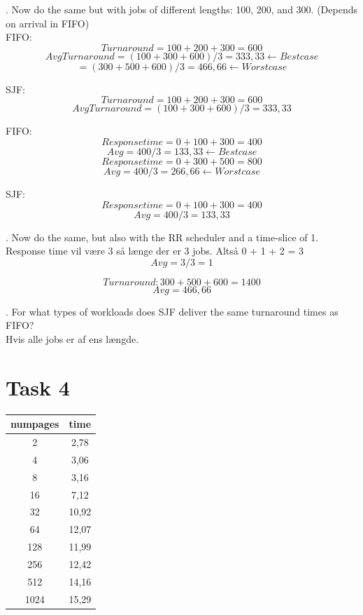 \documentclass[12pt]{article}
\begin{document}
. Now do the same but with jobs of different lengths: 100, 200, and 300.      (Depends on arrival in FIFO)\\

\noindent FIFO: 
$$Turnaround = 100 + 200 + 300 = 600$$     $$AvgTurnaround = (100 + 300 + 600) / 3 = 333,33     \leftarrow Best case$$
							   $$= (300 + 500 + 600) / 3 = 466,66     \leftarrow Worst case$$

\noindent SJF:
$$Turnaround = 100 + 200 + 300 = 600$$     $$AvgTurnaround = (100 + 300 + 600) / 3 = 333,33$$

\noindent FIFO: 
$$Response time = 0 + 100 + 300 = 400$$    $$Avg = 400/3 = 	133,33     \leftarrow Best case$$
      $$Response time = 0 + 300 + 500 = 800$$    $$Avg = 400/3 = 	266,66     \leftarrow Worst case$$
							   
\noindent SJF:  
$$Response time = 0 + 100 + 300 = 400$$    $$Avg = 400/3 = 	133,33$$


. Now do the same, but also with the RR scheduler and a time-slice of 1.\\
Response time vil være 3 så længe der er 3 jobs. Altså 0 + 1 + 2 = 3         
$$Avg = 3 / 3 = 1$$

$$Turnaround: 300 + 500 + 600 = 1400$$        $$Avg = 466,66$$

. For what types of workloads does SJF deliver the same turnaround times as FIFO?\\
Hvis alle jobs er af ens længde.


\section*{Task 4}

\begin{tabular}{|c|c|}
  \hline
  numpages & time\\
  \hline
  2 & 2,78\\
  4 & 3,06\\
  8 & 3,16\\
  16 & 7,12\\
  32 & 10,92\\
  64 & 12,07\\
  128 & 11,99\\
  256 & 12,42\\
  512 & 14,16\\
  1024 & 15,29\\
  \hline
\end{tabular}
\end{document}
